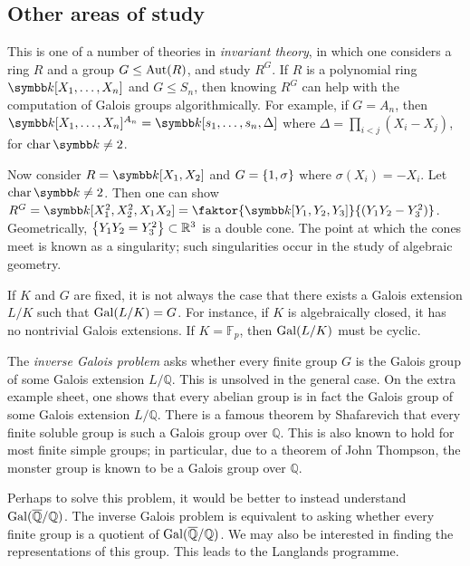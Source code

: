 \subsection{Other areas of study}
This is one of a number of theories in \emph{invariant theory}, in which one considers a ring \( R \) and a group \( G \leq \operatorname{Aut}(R) \), and study \( R^G \).
If \( R \) is a polynomial ring \( \symbb k[X_1, \dots, X_n] \) and \( G \leq S_n \), then knowing \( R^G \) can help with the computation of Galois groups algorithmically.
For example, if \( G = A_n \), then \( \symbb k[X_1, \dots, X_n]^{A_n} = \symbb k[s_1, \dots, s_n, \Delta] \) where \( \Delta = \prod_{i < j} (X_i - X_j) \), for \( \fchar \symbb k \neq 2 \).

Now consider \( R = \symbb k[X_1, X_2] \) and \( G = \qty{1, \sigma} \) where \( \sigma(X_i) = -X_i \).
Let \( \fchar \symbb k \neq 2 \).
Then one can show \( R^G = \symbb k[X_1^2, X_2^2, X_1 X_2] = \faktor{\symbb k[Y_1, Y_2, Y_3]}{(Y_1 Y_2 - Y_3^2)} \).
Geometrically, \( \qty{Y_1 Y_2 = Y_3^2} \subset \mathbb R^3 \) is a double cone.
The point at which the cones meet is known as a singularity; such singularities occur in the study of algebraic geometry.

If \( K \) and \( G \) are fixed, it is not always the case that there exists a Galois extension \( L / K \) such that \( \operatorname{Gal}(L/K) = G \).
For instance, if \( K \) is algebraically closed, it has no nontrivial Galois extensions.
If \( K = \mathbb F_p \), then \( \operatorname{Gal}(L/K) \) must be cyclic.

The \emph{inverse Galois problem} asks whether every finite group \( G \) is the Galois group of some Galois extension \( L / \mathbb Q \).
This is unsolved in the general case.
On the extra example sheet, one shows that every abelian group is in fact the Galois group of some Galois extension \( L / \mathbb Q \).
There is a famous theorem by Shafarevich that every finite soluble group is such a Galois group over \( \mathbb Q \).
This is also known to hold for most finite simple groups; in particular, due to a theorem of John Thompson, the monster group is known to be a Galois group over \( \mathbb Q \).

Perhaps to solve this problem, it would be better to instead understand \( \operatorname{Gal}(\overline{\mathbb Q}/\mathbb Q) \).
The inverse Galois problem is equivalent to asking whether every finite group is a quotient of \( \operatorname{Gal}(\overline{\mathbb Q}/\mathbb Q) \).
We may also be interested in finding the representations of this group.
This leads to the Langlands programme.
